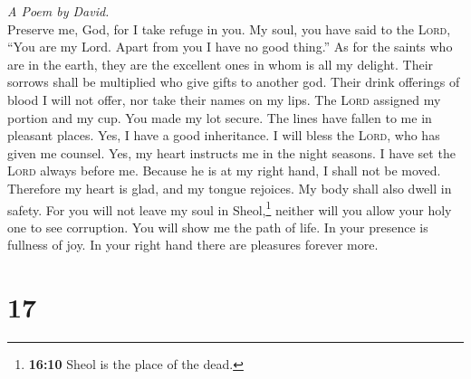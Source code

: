 \emph{A Poem by David.}\\
 Preserve me, God, for I take refuge in you.
 My soul, you have said to the \textsc{Lord}, ``You are my
Lord. Apart from you I have no good thing.''  As for the
saints who are in the earth, they are the excellent ones in whom is all
my delight.  Their sorrows shall be multiplied who give
gifts to another god. Their drink offerings of blood I will not offer,
nor take their names on my lips.  The \textsc{Lord}
assigned my portion and my cup. You made my lot secure. 
The lines have fallen to me in pleasant places. Yes, I have a good
inheritance.  I will bless the \textsc{Lord}, who has
given me counsel. Yes, my heart instructs me in the night seasons.
 I have set the \textsc{Lord} always before me. Because he
is at my right hand, I shall not be moved.  Therefore my
heart is glad, and my tongue rejoices. My body shall also dwell in
safety.  For you will not leave my soul in
Sheol,\footnote{\textbf{16:10} Sheol is the place of the dead.} neither
will you allow your holy one to see corruption.  You will
show me the path of life. In your presence is fullness of joy. In your
right hand there are pleasures forever more.

\hypertarget{section-16}{%
\section{17}\label{section-16}}

